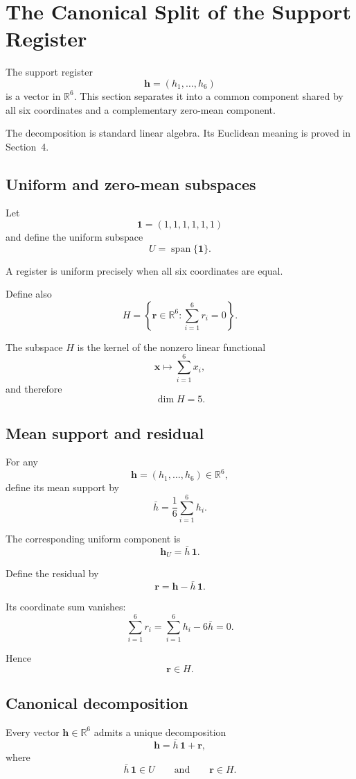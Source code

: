 \section{The Canonical Split of the Support Register}

The support register
\[
\mathbf h=(h_1,\ldots,h_6)
\]
is a vector in \(\mathbb R^6\). This section separates it into a common
component shared by all six coordinates and a complementary zero-mean
component.

The decomposition is standard linear algebra. Its Euclidean meaning is
proved in Section~4.

\subsection{Uniform and zero-mean subspaces}

Let
\[
\mathbf 1=(1,1,1,1,1,1)
\]
and define the uniform subspace
\[
U=\operatorname{span}\{\mathbf 1\}.
\]

A register is uniform precisely when all six coordinates are equal.

Define also
\[
H=
\left\{
\mathbf r\in\mathbb R^6:
\sum_{i=1}^{6}r_i=0
\right\}.
\]

The subspace \(H\) is the kernel of the nonzero linear functional
\[
\mathbf x\longmapsto\sum_{i=1}^{6}x_i,
\]
and therefore
\[
\dim H=5.
\]

\subsection{Mean support and residual}

For any
\[
\mathbf h=(h_1,\ldots,h_6)\in\mathbb R^6,
\]
define its mean support by
\[
\bar h
=
\frac{1}{6}\sum_{i=1}^{6}h_i.
\]

The corresponding uniform component is
\[
\mathbf h_U
=
\bar h\,\mathbf 1.
\]

Define the residual by
\[
\mathbf r
=
\mathbf h-\bar h\,\mathbf 1.
\]

Its coordinate sum vanishes:
\[
\sum_{i=1}^{6}r_i
=
\sum_{i=1}^{6}h_i-6\bar h
=
0.
\]

Hence
\[
\mathbf r\in H.
\]

\subsection{Canonical decomposition}

\begin{theorem}
Every vector \(\mathbf h\in\mathbb R^6\) admits a unique decomposition
\[
\mathbf h
=
\bar h\,\mathbf 1+\mathbf r,
\]
where
\[
\bar h\,\mathbf 1\in U
\qquad\text{and}\qquad
\mathbf r\in H.
\]
\end{theorem}


